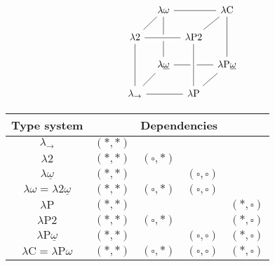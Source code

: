 \documentclass[reqno, twoside]{article}
\begin{document}
    \begin{center}
        \begin{minipage}{0.3\textwidth}
            \vspace{-0.15in}
            \begin{equation*}
                \begin{tikzcd}[row sep=scriptsize, column sep=0.1in]
                    & \lambda\omega \arrow[dl, -] \arrow[rr, -] \arrow[dd, -] & & \lambda\mathrm{C} \arrow[dl, -] \arrow[dd, -] \\
                    \lambda2 \arrow[rr, crossing over, -] \arrow[dd, -] & & \lambda\mathrm{P}2 \\
                    & \lambda\underline{\omega} \arrow[dl, -] \arrow[rr, -] & & \lambda\mathrm{P}\underline{\omega} \arrow[dl, -] \\
                    \lambda_\rightarrow \arrow[rr, -] & & \lambda\mathrm{P} \arrow[from=uu, crossing over, -]
                \end{tikzcd}
                \vspace{-0.05in}
            \end{equation*}
        \end{minipage}
        \begin{minipage}{0.5\textwidth}\small
            \begin{center}
                \begin{tabular}{c|cccc}
                    Type system & \multicolumn{4}{c}{Dependencies} \\
                    \hline
                    $\lambda_\rightarrow$                       & $(\ast,\ast)$ &                  &                     &                  \\
                    $\lambda2$                                  & $(\ast,\ast)$ & $(\square,\ast)$ &                     &                  \\
                    $\lambda\underline{\omega}$                 & $(\ast,\ast)$ &                  & $(\square,\square)$ &                  \\
                    $\lambda\omega=\lambda2\underline{\omega}$  & $(\ast,\ast)$ & $(\square,\ast)$ & $(\square,\square)$ &                  \\
                    $\lambda\mathrm{P}$                         & $(\ast,\ast)$ &                  &                     & $(\ast,\square)$ \\
                    $\lambda\mathrm{P}2$                        & $(\ast,\ast)$ & $(\square,\ast)$ &                     & $(\ast,\square)$ \\
                    $\lambda\mathrm{P}\underline{\omega}$       & $(\ast,\ast)$ &                  & $(\square,\square)$ & $(\ast,\square)$ \\
                    $\lambda\mathrm{C}=\lambda\mathrm{P}\omega$ & $(\ast,\ast)$ & $(\square,\ast)$ & $(\square,\square)$ & $(\ast,\square)$ \\
                \end{tabular}
            \end{center}
        \end{minipage}
    \end{center}
\end{document}

